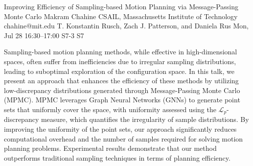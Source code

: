 \begin{talk}
  {Improving Efficiency of Sampling-based Motion Planning via Message-Passing Monte Carlo}%
  {Makram Chahine}%
  {CSAIL, Massachusetts Institute of Technology}%
  {chahine@mit.edu}%
  {T. Konstantin Rusch, Zach J. Patterson, and Daniela Rus}%
  {}%
  {Mon, Jul 28 16:30–17:00}%
  {S7-3}%
  {S7}%
  
				
			
Sampling-based motion planning methods, while effective in high-dimensional spaces, often suffer from inefficiencies due to irregular sampling distributions, leading to suboptimal exploration of the configuration space. In this talk, we present an approach that enhances the efficiency of these methods by utilizing low-discrepancy distributions generated through Message-Passing Monte Carlo (MPMC). MPMC leverages Graph Neural Networks (GNNs) to generate point sets that uniformly cover the space, with uniformity assessed using the $\mathcal{L}_p$-discrepancy measure, which quantifies the irregularity of sample distributions. By improving the uniformity of the point sets, our approach significantly reduces computational overhead and the number of samples required for solving motion planning problems. Experimental results demonstrate that our method outperforms traditional sampling techniques in terms of planning efficiency.

\medskip


\end{talk}

